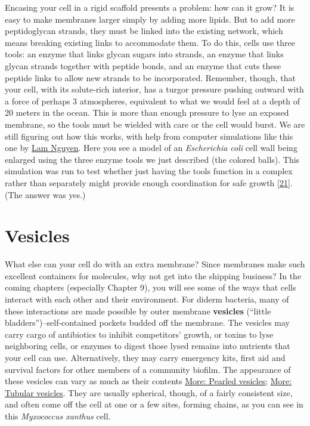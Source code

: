 \documentclass[]{tufte-book}
\begin{document}
Encasing your cell in a rigid scaffold presents a problem: how can it grow? It is easy to make membranes larger simply by adding more lipids. But to add more peptidoglycan strands, they must be linked into the existing network, which means breaking existing links to accommodate them. To do this, cells use three tools: an enzyme that links glycan sugars into strands, an enzyme that links glycan strands together with peptide bonds, and an enzyme that cuts these peptide links to allow new strands to be incorporated. Remember, though, that your cell, with its solute-rich interior, has a turgor pressure pushing outward with a force of perhaps 3 atmospheres, equivalent to what we would feel at a depth of 20 meters in the ocean. This is more than enough pressure to lyse an exposed membrane, so the tools must be wielded with care or the cell would burst. We are still figuring out how this works, with help from computer simulations like this one by \protect\hyperlink{lam_nguyen}{Lam Nguyen}. Here you see a model of an \emph{Escherichia coli} cell wall being enlarged using the three enzyme tools we just described (the colored balls). This simulation was run to test whether just having the tools function in a complex rather than separately might provide enough coordination for safe growth {[}\protect\hyperlink{ref-nguyen2015}{21}{]}. (The answer was yes.)

\hypertarget{vesicles}{%
\section{Vesicles}\label{vesicles}}

What else can your cell do with an extra membrane? Since membranes make such excellent containers for molecules, why not get into the shipping business? In the coming chapters (especially Chapter 9), you will see some of the ways that cells interact with each other and their environment. For diderm bacteria, many of these interactions are made possible by outer membrane \textbf{vesicles} (``little bladders'')--self-contained pockets budded off the membrane. The vesicles may carry cargo of antibiotics to inhibit competitors' growth, or toxins to lyse neighboring cells, or enzymes to digest those lysed remains into nutrients that your cell can use. Alternatively, they may carry emergency kits, first aid and survival factors for other members of a community biofilm. The appearance of these vesicles can vary as much as their contents \protect\hyperlink{Pearled_vesicles}{More: Pearled vesicles}; \protect\hyperlink{Tubular_vesicles}{More: Tubular vesicles}. They are usually spherical, though, of a fairly consistent size, and often come off the cell at one or a few sites, forming chains, as you can see in this \emph{Myxococcus xanthus} cell.
\end{document}
